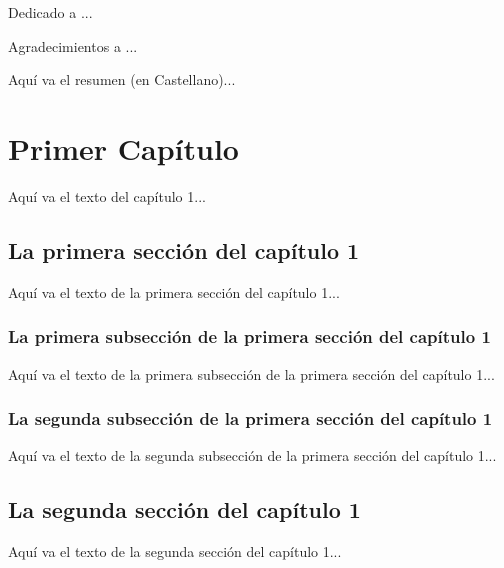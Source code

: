 \documentclass{iccmemoria}
\author{Nombre del Alumno}
\date{mes, año}
\begin{document}
\maketitle

\begin{dedicatory}
Dedicado a ...
\end{dedicatory}

\begin{acknowledgment}
Agradecimientos a ...
\end{acknowledgment}

\tableofcontents
\listoffigures
\listoftables

\begin{resumen}
Aquí va el resumen (en Castellano)... 
\end{resumen}


\chapter{Primer Capítulo}
Aquí va el texto del capítulo 1...

\section{La primera sección del capítulo 1}
Aquí va el texto de la primera sección del capítulo 1... 

\subsection{La primera subsección de la primera sección del capítulo 1}
Aquí va el texto de la primera subsección de la primera sección del capítulo 1... 

\subsection{La segunda subsección de la primera sección del capítulo 1}
Aquí va el texto de la segunda subsección de la primera sección del capítulo 1...

\section{La segunda sección del capítulo 1}
Aquí va el texto de la segunda sección del capítulo 1...


\end{document}
